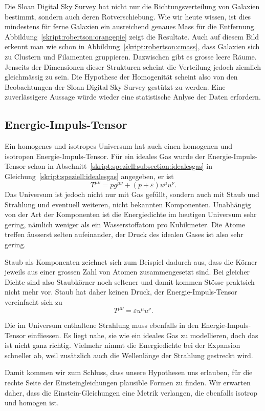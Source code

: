 Die Sloan Digital Sky Survey \cite{skript:sdss} hat nicht nur die
Richtungsverteilung von
Galaxien bestimmt, sondern auch deren Rotverschiebung.
Wie wir heute wissen, ist dies mindestens für ferne Galaxien ein ausreichend
genaues Mass für die Entfernung.
Abbildung~\ref{skript:robertson:orangepie} zeigt die Resultate.
Auch auf diesem Bild erkennt man wie schon in
Abbildung~\ref{skript:robertson:cmass}, dass Galaxien sich zu Clustern
und Filamenten gruppieren.
Dazwischen gibt es grosse leere Räume.
Jenseits der Dimensionen dieser Strukturen scheint die Verteilung jedoch
ziemlich gleichmässig zu sein.
Die Hypothese der Homogenität scheint also von den Beobachtungen der
Sloan Digital Sky Survey gestützt zu werden.
Eine zuverlässigere Aussage würde wieder eine statistische Anlyse der 
Daten erfordern.

\subsection{Energie-Impuls-Tensor}
Ein homogenes und isotropes Universum hat auch einen homogenen
und isotropen Energie-Impuls-Tensor.
Für ein ideales Gas wurde der Energie-Impuls-Tensor schon in
Abschnitt~\ref{skript:speziell:subsection:idealesgas}
in Gleichung~\eqref{skript:speziell:idealesgas} angegeben, er ist
\[
T^{\mu\nu} = pg^{\mu\nu} + (p+\varepsilon)u^\mu u^\nu.
\]
Das Universum ist jedoch nicht nur mit Gas gefüllt, sondern auch
mit Staub und Strahlung und eventuell weiteren, nicht bekannten
Komponenten.
Unabhängig von der Art der Komponenten ist die Energiedichte
im heutigen Universum sehr gering, nämlich weniger als ein Wasserstoffatom
pro Kubikmeter.
Die Atome treffen äusserst selten aufeinander,
der Druck des idealen Gases ist also sehr gering.

Staub als Komponenten zeichnet sich zum Beispiel dadurch aus, dass die Körner
jeweils aus einer grossen Zahl von Atomen zusammengesetzt sind.
Bei gleicher Dichte sind also Staubkörner noch seltener und damit kommen
Stösse praktsich nicht mehr vor.
Staub hat daher keinen Druck, der Energie-Impuls-Tensor vereinfacht sich zu
\[
T^{\mu\nu}
=
\varepsilon u^\mu u^\nu.
\]

Die im Universum enthaltene Strahlung muss ebenfalls in den
Energie-Impuls-Tensor einfliessen.
Es liegt nahe, sie wie ein
ideales Gas zu modellieren, doch das ist nicht ganz richtig.
Vielmehr nimmt die Energiedichte bei der Expansion schneller ab, weil
zusätzlich auch die Wellenlänge der Strahlung gestreckt wird.

Damit kommen wir zum Schluss, dass unsere Hypothesen uns erlauben,
für die rechte Seite der Einsteingleichungen plausible Formen zu
finden.
Wir erwarten daher, dass die Einstein-Gleichungen eine Metrik 
verlangen, die ebenfalls isotrop und homogen ist.

